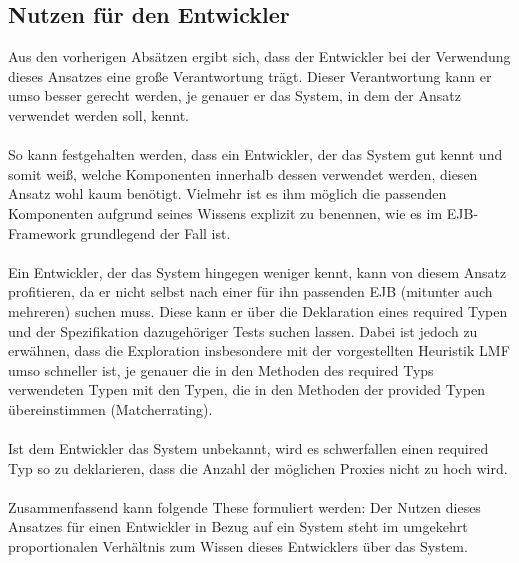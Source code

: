 \subsection{Nutzen für den Entwickler}
Aus den vorherigen Absätzen ergibt sich, dass der Entwickler bei der Verwendung dieses Ansatzes eine große Verantwortung trägt. Dieser Verantwortung kann er umso besser gerecht werden, je genauer er das System, in dem der Ansatz verwendet werden soll, kennt. 
\\\\
So kann festgehalten werden, dass ein Entwickler, der das System gut kennt und somit weiß, welche Komponenten innerhalb dessen verwendet werden, diesen Ansatz wohl kaum benötigt. Vielmehr ist es ihm möglich die passenden Komponenten aufgrund seines Wissens explizit zu benennen, wie es im EJB-Framework grundlegend der Fall ist.
\\\\
Ein Entwickler, der das System hingegen weniger kennt, kann von diesem Ansatz profitieren, da er nicht selbst nach einer für ihn passenden EJB (mitunter auch mehreren) suchen muss. Diese kann er über die Deklaration eines required Typen und der Spezifikation dazugehöriger Tests suchen lassen. Dabei ist jedoch zu erwähnen, dass die Exploration insbesondere mit der vorgestellten Heuristik LMF umso schneller ist, je genauer die in den Methoden des required Typs verwendeten Typen mit den Typen, die in den Methoden der provided Typen übereinstimmen (Matcherrating).
\\\\
Ist dem Entwickler das System unbekannt, wird es schwerfallen einen required Typ so zu deklarieren, dass die Anzahl der möglichen Proxies nicht zu hoch wird. 
\\\\
Zusammenfassend kann folgende These formuliert werden: Der Nutzen dieses Ansatzes für einen Entwickler in Bezug auf ein System steht im umgekehrt proportionalen Verhältnis zum Wissen dieses Entwicklers über das System. 

